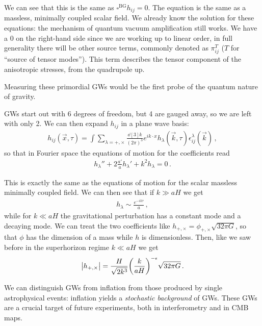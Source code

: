 \documentclass[main.tex]{subfiles}
\begin{document}
We can see that this is the same as \(\square^{\text{BG}} h_{ij} = 0\). The equation is the same as a massless, minimally coupled scalar field. 
We already know the solution for these equations: the mechanism of quantum vacuum amplification still works. 
We have a 0 on the right-hand side since we are working up to linear order, in full generality there will be other source terms, commonly denoted as \(\pi^{T}_{ij}\) (\(T\) for ``source of tensor modes''). 
This term describes the tensor component of the anisotropic stresses, from the quadrupole up.

Measuring these primordial GWs would be the first probe of the quantum nature of gravity.

GWs start out with 6 degrees of freedom, but 4 are gauged away, so we are left with only 2. 
We can then expand \(h_{ij}\) in a plane wave basis: 
%
\begin{align}
h_{ij} (\vec{x}, \tau )
= \int  \sum_{\lambda = +, \times }
\frac{ \dd[3]{k}}{(2 \pi )^3}
e^{i k \cdot x}
h_\lambda (\vec{k}, \tau ) \epsilon^\lambda_{ij} (\vec{k})
\,,
\end{align}
%
so that in Fourier space the equations of motion for the coefficients read
%
\begin{align}
h_\lambda'' + 2 \frac{a'}{a} h_\lambda' + k^2 h_\lambda = 0
\,.
\end{align}

This is exactly the same as the equations of motion for the scalar massless minimally coupled field. 
We can then see that if \(k \gg aH\) we get 
%
\begin{align}
h_\lambda \sim \frac{e^{-ik \tau }}{a}
\,,
\end{align}
%
while for \(k \ll aH\) the gravitational perturbation has a constant mode and a decaying mode. 
We can treat the two coefficients like \(h_{+, \times } = \phi_{+, \times } \sqrt{32 \pi G}\), so that \(\phi \) has the dimension of a mass while \(h\) is dimensionless. 
Then, like we saw before in the superhorizon regime \(k\ll aH\) we get
%
\begin{align}
\abs{h_{+, \times }} = \frac{H}{\sqrt{2 k^3}}
\qty( \frac{k}{aH})^{-\epsilon } \sqrt{32 \pi G}
\,.
\end{align}

We can distinguish GWs from inflation from those produced by single astrophysical events: inflation yields a \emph{stochastic background} of GWs. 
These GWs are a crucial target of future experiments, both in interferometry and in CMB maps. 
\end{document}
